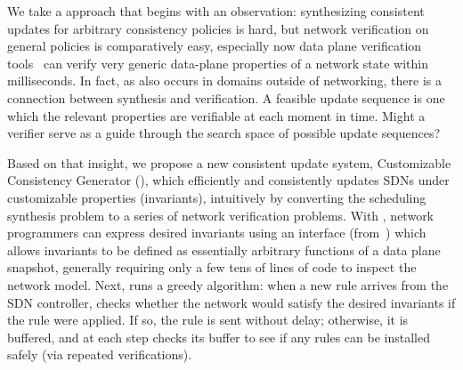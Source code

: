 We take a  approach that begins with an observation:
synthesizing consistent updates for arbitrary consistency policies
is hard, but network verification on general policies is comparatively easy,
especially now  data plane verification 
tools~\cite{VeriFlow, Al-Shaer2010, NetPlumber2013}
can verify very generic data-plane properties of a network
state within milliseconds. In fact, as also occurs in domains outside of networking, 
there is a connection between synthesis and verification. 
A feasible update sequence is one which the relevant properties are verifiable at each moment in time.
Might a verifier serve as a guide through the search space of possible update sequences?

Based on that insight, we propose a new consistent update system,  
Customizable Consistency Generator (\name), which efficiently and consistently updates
SDNs under customizable properties (invariants), intuitively by converting the scheduling synthesis problem
to a series of network verification problems.
With \name, network programmers can express desired invariants using an interface (from~\cite{VeriFlow})
which allows invariants to be defined as essentially arbitrary functions of a data plane snapshot,
generally requiring only a few tens of lines of code to inspect the network model. 
Next, \name runs a greedy algorithm: when a new rule arrives from the SDN controller, 
\name checks whether the network would satisfy the desired invariants if the rule were applied. 
If so, the rule is sent without delay; otherwise, it is buffered, 
and at each step \name checks its buffer to see if any rules can be installed safely
(via repeated verifications).

